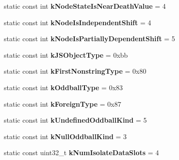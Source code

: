 \begin{DoxyCompactItemize}
\item 
\hypertarget{classv8_1_1internal_1_1_internals_a18f3e757639b07bdabb8cda7dd4a8bdb}{}static const int {\bfseries k\+Node\+State\+Is\+Near\+Death\+Value} = 4\label{classv8_1_1internal_1_1_internals_a18f3e757639b07bdabb8cda7dd4a8bdb}

\item 
\hypertarget{classv8_1_1internal_1_1_internals_a228b2b58c77c17bc512b92d9e3aea48b}{}static const int {\bfseries k\+Node\+Is\+Independent\+Shift} = 4\label{classv8_1_1internal_1_1_internals_a228b2b58c77c17bc512b92d9e3aea48b}

\item 
\hypertarget{classv8_1_1internal_1_1_internals_aeda4d6fc1bd10ca57398597f3bb496f3}{}static const int {\bfseries k\+Node\+Is\+Partially\+Dependent\+Shift} = 5\label{classv8_1_1internal_1_1_internals_aeda4d6fc1bd10ca57398597f3bb496f3}

\item 
\hypertarget{classv8_1_1internal_1_1_internals_a56b7062df5d9a7df491137d4c3341bcc}{}static const int {\bfseries k\+J\+S\+Object\+Type} = 0xbb\label{classv8_1_1internal_1_1_internals_a56b7062df5d9a7df491137d4c3341bcc}

\item 
\hypertarget{classv8_1_1internal_1_1_internals_a6f4a54927b01a11f444fb2f00b47ca1d}{}static const int {\bfseries k\+First\+Nonstring\+Type} = 0x80\label{classv8_1_1internal_1_1_internals_a6f4a54927b01a11f444fb2f00b47ca1d}

\item 
\hypertarget{classv8_1_1internal_1_1_internals_a13081e936f8c96472f1b1496c70d4dc1}{}static const int {\bfseries k\+Oddball\+Type} = 0x83\label{classv8_1_1internal_1_1_internals_a13081e936f8c96472f1b1496c70d4dc1}

\item 
\hypertarget{classv8_1_1internal_1_1_internals_a263195f36f9e8ee64af70dc267a85d55}{}static const int {\bfseries k\+Foreign\+Type} = 0x87\label{classv8_1_1internal_1_1_internals_a263195f36f9e8ee64af70dc267a85d55}

\item 
\hypertarget{classv8_1_1internal_1_1_internals_a39072b9e0ffea4031f4a1c514208b20d}{}static const int {\bfseries k\+Undefined\+Oddball\+Kind} = 5\label{classv8_1_1internal_1_1_internals_a39072b9e0ffea4031f4a1c514208b20d}

\item 
\hypertarget{classv8_1_1internal_1_1_internals_a72243c5512cb5cab9d10b6f29e775180}{}static const int {\bfseries k\+Null\+Oddball\+Kind} = 3\label{classv8_1_1internal_1_1_internals_a72243c5512cb5cab9d10b6f29e775180}

\item 
\hypertarget{classv8_1_1internal_1_1_internals_a258de87ae638f06a1deebccf4fd93c3f}{}static const uint32\+\_\+t {\bfseries k\+Num\+Isolate\+Data\+Slots} = 4\label{classv8_1_1internal_1_1_internals_a258de87ae638f06a1deebccf4fd93c3f}

\end{DoxyCompactItemize}



